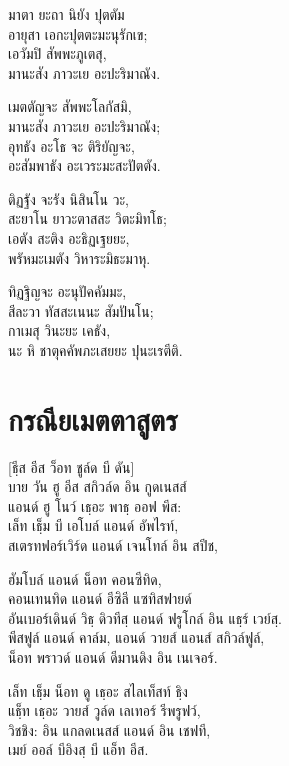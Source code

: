 มาตา ยะถา นิยัง ปุตตัม\\
อายุสา เอกะปุตตะมะนุรักเข;\\
เอวัมปิ สัพพะภูเตสุ,\\
มานะสัง ภาวะเย อะปะริมาณัง.

เมตตัญจะ สัพพะโลกัสมิ,\\
มานะสัง ภาวะเย อะปะริมาณัง;\\
อุทธัง อะโธ จะ ติริยัญจะ,\\
อะสัมพาธัง อะเวระมะสะปัตตัง.

ติฏฐัง จะรัง นิสินโน วะ,\\
สะยาโน ยาวะตาสสะ วิตะมิทโธ;\\
เอตัง สะติง อะธิฏเฐยยะ,\\
พรัหมะเมตัง วิหาระมิธะมาหุ.

ทิฏฐิญจะ อะนุปัคคัมมะ,\\
สีละวา ทัสสะเนนะ สัมปันโน;\\
กาเมสุ วินะยะ เคธัง,\\
นะ หิ ชาตุคคัพภะเสยยะ ปุนะเรตีติ.

\chapter{กรณียเมตตาสูตร}


\begin{leader}
\end{leader}

[ธฺีส อีส ว็อท ชูล์ด บี ดัน]\\
บาย วัน ฮู อีส สกิวล์ด อิน กูดเนสส์\\
แอนด์ ฮู โนว์ เธฺอะ พาธฺ ออฟ พีส:\\
เล็ท เธฺ็ม บี เอโบล์ แอนด์ อัพไรท์,\\
สเตรทฟอร์เวิร์ด แอนด์ เจนโทล์ อิน สปีช,

ฮัมโบล์ แอนด์ น็อท คอนซีทิด,\\
คอนเทนทิด แอนด์ อีซิลี แซทิสฟายด์\\
อันเบอร์เดินด์ วิธฺ ดิวทีสฺ แอนด์ ฟรูโกล์ อิน แธฺร์ เวย์สฺ.\\
พีสฟูล์ แอนด์ คาล์ม, แอนด์ วายส์ แอนส์ สกิวล์ฟูล์,\\
น็อท พราวด์ แอนด์ ดีมานดิง อิน เนเจอร์.

เล็ท เธฺ็ม น็อท ดู เธฺอะ สไลเท็สท์ ธฺิง\\
แธฺ็ท เธฺอะ วายส์ วูล์ด เลเทอร์ รีพรูฟว์,\\
วิชชิง: อิน แกลดเนสส์ แอนด์ อิน เชฟที,\\
เมย์ ออล์ บีอิงสฺ บี แอ็ท อีส.

